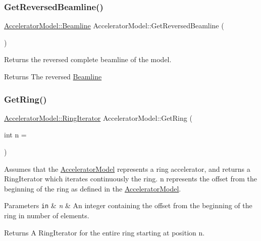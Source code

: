 \subsubsection{\texorpdfstring{Get\+Reversed\+Beamline()}{GetReversedBeamline()}}
{\footnotesize\ttfamily \hyperlink{classAcceleratorModel_1_1Beamline}{Accelerator\+Model\+::\+Beamline} Accelerator\+Model\+::\+Get\+Reversed\+Beamline (\begin{DoxyParamCaption}{ }\end{DoxyParamCaption})}

Returns the reversed complete beamline of the model. \begin{DoxyReturn}{Returns}
The reversed \hyperlink{classAcceleratorModel_1_1Beamline}{Beamline} 
\end{DoxyReturn}
\mbox{\label{classAcceleratorModel_ab1da9f1e5c94b3d59a04a4039f3fe208}} 
\subsubsection{\texorpdfstring{Get\+Ring()}{GetRing()}}
{\footnotesize\ttfamily \hyperlink{classring__iterator}{Accelerator\+Model\+::\+Ring\+Iterator} Accelerator\+Model\+::\+Get\+Ring (\begin{DoxyParamCaption}\item[{int}]{n = {} }\end{DoxyParamCaption})}

Assumes that the \hyperlink{classAcceleratorModel}{Accelerator\+Model} represents a ring accelerator, and returns a Ring\+Iterator which iterates continuously the ring. n represents the offset from the beginning of the ring as defined in the \hyperlink{classAcceleratorModel}{Accelerator\+Model}. 
\begin{DoxyParams}[1]{Parameters}
\mbox{\tt in}  & {\em n} & An integer containing the offset from the beginning of the ring in number of elements. \\
\hline
\end{DoxyParams}
\begin{DoxyReturn}{Returns}
A Ring\+Iterator for the entire ring starting at position n. 
\end{DoxyReturn}
\mbox{\label{classAcceleratorModel_aa923525617851a9e195bb2e2ff861c10}} 
